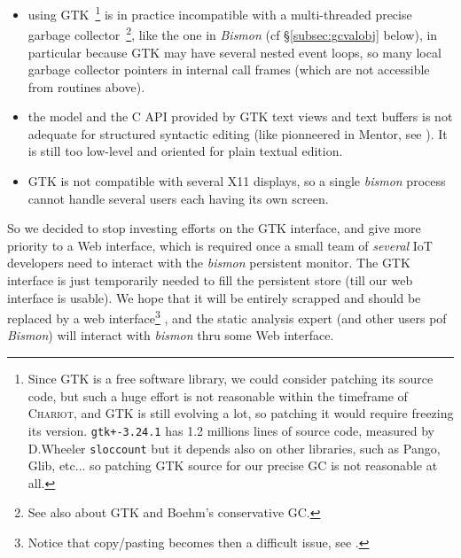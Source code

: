\begin{itemize}
\item using GTK~\footnote{Since GTK is a free software library, we
  could consider patching its source code, but such a huge effort is
  not reasonable within the timeframe of \textsc{Chariot}, and GTK is
  still evolving a lot, so patching it would require freezing its
  version. \texttt{gtk+-3.24.1} has 1.2 millions lines of source code,
  measured by D.Wheeler \texttt{sloccount} but it depends also on
  other libraries, such as Pango, Glib, etc... so patching GTK source
  for our precise GC is not reasonable at all.}  is in practice
  incompatible with a multi-threaded precise garbage
  collector~\footnote{See also
     about GTK and
    Boehm's conservative GC.}, like the one in \emph{Bismon} (cf
  \S\ref{subsec:gcvalobj} below), in particular because GTK may have
  several nested event loops, so many local garbage collector pointers
  in internal call frames (which are not accessible from routines
  above).

    \item the model and the C API provided by GTK text views and text
      buffers is not adequate for structured syntactic editing (like
      pionneered in Mentor, see \cite{donzeaugouge:inria-mentor}). It is still too low-level and oriented for plain textual edition.

      \item GTK is not compatible with several X11 displays, so a
        single \emph{bismon} process cannot handle several users each
        having its own screen.
\end{itemize}

So we decided to stop investing efforts on the GTK interface, and give
more priority to a Web interface, which is required once a small team
of \emph{several} IoT developers need to interact with the
\emph{bismon} persistent monitor. The GTK interface is just
temporarily needed to fill the persistent store (till our web
interface is usable). We hope that it will be entirely scrapped and
should be replaced by a web interface\footnote{Notice that
 copy/pasting becomes then a difficult issue, see
.}
, and the static analysis expert (and other users pof \emph{Bismon})
will interact with \emph{bismon} thru some Web interface.

